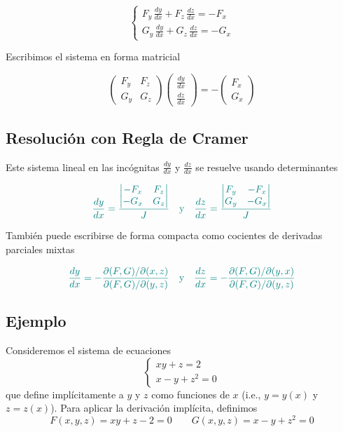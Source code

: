 \documentclass{article}
\begin{document}
\[
\begin{cases}
F_y\,\frac{dy}{dx}+F_z\,\frac{dz}{dx}=-F_x \\
G_y\,\frac{dy}{dx}+G_z\,\frac{dz}{dx}=-G_x
\end{cases}
\]

Escribimos el sistema en forma matricial

\[
\begin{pmatrix}
F_y & F_z \\
G_y & G_z
\end{pmatrix}
\begin{pmatrix}
\frac{dy}{dx} \\
\frac{dz}{dx}
\end{pmatrix}
=
-\begin{pmatrix}
F_x \\
G_x
\end{pmatrix}
\]

\subsection*{Resolución con Regla de Cramer}

Este sistema lineal en las incógnitas \( \frac{dy}{dx} \) y \( \frac{dz}{dx} \) se resuelve usando determinantes

\[\color{teal}
\frac{dy}{dx} =
\frac{
\begin{vmatrix}
-F_x & F_z \\
-G_x & G_z
\end{vmatrix}
}{J}
\quad \text{y} \quad
\frac{dz}{dx} =
\frac{
\begin{vmatrix}
F_y & -F_x \\
G_y & -G_x
\end{vmatrix}
}{J}
\]

También puede escribirse de forma compacta como cocientes de derivadas parciales mixtas

\[\color{teal}
\frac{dy}{dx} = -\frac{\partial(F,G)/\partial(x,z)}{\partial(F,G)/\partial(y,z)}
\quad \text{y} \quad 
\frac{dz}{dx} = -\frac{\partial(F,G)/\partial(y,x)}{\partial(F,G)/\partial(y,z)}
\]
\subsection*{Ejemplo}

Consideremos el sistema de ecuaciones
\[
\begin{cases}
xy + z = 2 \\
x - y + z^2 = 0
\end{cases}
\]
que define implícitamente a \( y \) y \( z \) como funciones de \( x \) (i.e., \( y=y(x) \) y \( z=z(x) \)). Para aplicar la derivación implícita, definimos
\[
F(x,y,z) = xy + z - 2 = 0 \qquad G(x,y,z) = x - y + z^2 = 0
\]
\end{document}
